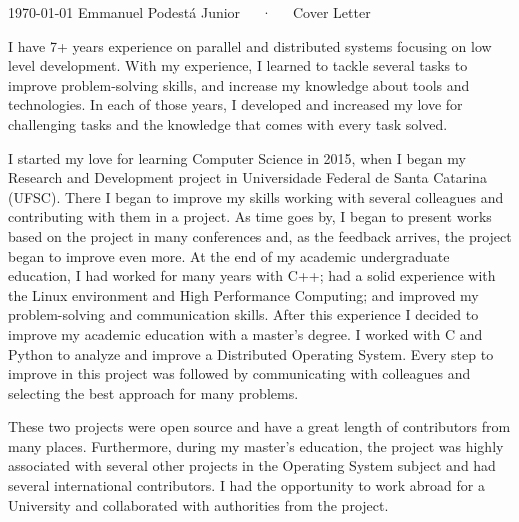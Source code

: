 \documentclass[11pt, a4paper]{awesome-cv}
\begin{document}
\makecvheader[R]

\makecvfooter
  {\today}
  {Emmanuel Podestá Junior~~~·~~~Cover Letter}
  {}

\makelettertitle

\begin{cvletter}


I have 7+ years experience on parallel and distributed systems focusing on low
level development. With my experience, I learned to tackle several tasks to
improve problem-solving skills, and increase my knowledge about tools and
technologies. In each of those years, I developed and increased my love for
challenging tasks and the knowledge that comes with every task solved.

I started my love for learning Computer Science in 2015, when I began my
Research and Development project in Universidade Federal de Santa Catarina
(UFSC). There I began to improve my skills working with several colleagues and
contributing with them in a project. As time goes by, I began to present works
based on the project in many conferences and, as the feedback arrives, the
project began to improve even more. At the end of my academic undergraduate
education, I had worked for many years with C++; had a solid experience with the
Linux environment and High Performance Computing; and improved my
problem-solving and communication skills.  After this experience I decided to
improve my academic education with a master's degree. I worked with C and Python
to analyze and improve a Distributed Operating System. Every step to improve in
this project was followed by communicating with colleagues and selecting the
best approach for many problems.

These two projects were open source and have a great length of contributors from
many places. Furthermore, during my master's education, the project was highly
associated with several other projects in the Operating System subject and had
several international contributors. I had the opportunity to work abroad for a
University and collaborated with authorities from the project.


\end{cvletter}
\end{document}
